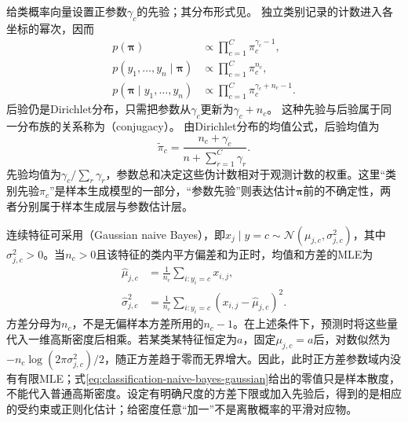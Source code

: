 给类概率向量设置正参数$\gamma_c$的先验；其分布形式见。
独立类别记录的计数进入各坐标的幂次，因而
\[
  \begin{aligned}
    p(\bm{\pi})
      &\propto\prod_{c=1}^{C}\pi_c^{\gamma_c-1},\\
    p(y_1,\ldots,y_n\mid\bm{\pi})
      &\propto\prod_{c=1}^{C}\pi_c^{n_c},\\
    p(\bm{\pi}\mid y_1,\ldots,y_n)
      &\propto\prod_{c=1}^{C}\pi_c^{\gamma_c+n_c-1}.
  \end{aligned}
\]
后验仍是Dirichlet分布，只需把参数从$\gamma_c$更新为$\gamma_c+n_c$。
这种先验与后验属于同一分布族的关系称为（conjugacy）。
由Dirichlet分布的均值公式，后验均值为
\[
  \tilde\pi_c=\frac{n_c+\gamma_c}
  {n+\sum_{r=1}^{C}\gamma_r}.
\]
先验均值为$\gamma_c/\sum_r\gamma_r$，参数总和决定这些伪计数相对于观测计数的权重。这里“类别先验$\pi_c$”是样本生成模型的一部分，“参数先验”则表达估计$\bm{\pi}$前的不确定性，两者分别属于样本生成层与参数估计层。

连续特征可采用（Gaussian naive Bayes），即$x_j\mid y=c\sim\mathcal{N}(\mu_{j,c},\sigma_{j,c}^{2})$，其中$\sigma_{j,c}^{2}>0$。当$n_c>0$且该特征的类内平方偏差和为正时，均值和方差的MLE为
\begin{equation}
  \label{eq:classification-naive-bayes-gaussian}
  \begin{aligned}
    \hat\mu_{j,c}
      &=\frac{1}{n_c}\sum_{i:y_i=c}x_{i,j},\\
    \hat\sigma_{j,c}^{2}
      &=\frac{1}{n_c}\sum_{i:y_i=c}
        (x_{i,j}-\hat\mu_{j,c})^2.
  \end{aligned}
\end{equation}
方差分母为$n_c$，不是无偏样本方差所用的$n_c-1$。在上述条件下，预测时将这些量代入一维高斯密度后相乘。若某类某特征恒定为$a$，固定$\mu_{j,c}=a$后，对数似然为$-n_c\log(2\pi\sigma_{j,c}^{2})/2$，随正方差趋于零而无界增大。因此，此时正方差参数域内没有有限MLE；式\eqref{eq:classification-naive-bayes-gaussian}给出的零值只是样本散度，不能代入普通高斯密度。设定有明确尺度的方差下限或加入先验后，得到的是相应的受约束或正则化估计；给密度任意“加一”不是离散概率的平滑对应物。

